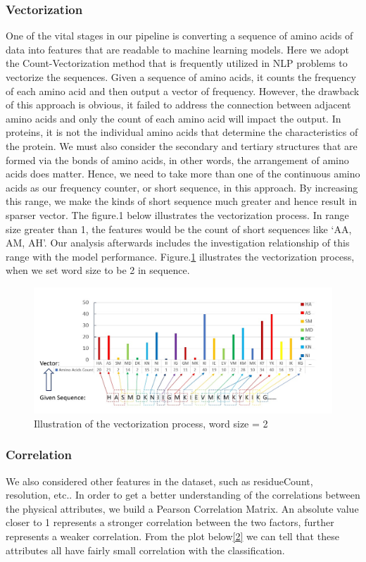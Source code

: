 \documentclass[sigconf]{acmart}
\begin{document}
\subsubsection{Vectorization}
One of the vital stages in our pipeline is converting a sequence of amino acids of data into features that are readable to machine learning models. Here we adopt the Count-Vectorization method that is frequently utilized in NLP problems to vectorize the sequences. Given a sequence of amino acids, it counts the frequency of each amino acid and then output a vector of frequency. However, the drawback of this approach is obvious, it failed to address the connection between adjacent amino acids and only the count of each amino acid will impact the output. In proteins, it is not the individual amino acids that determine the characteristics of the protein. We must also consider the secondary and tertiary structures that are formed via the bonds of amino acids, in other words, the arrangement of amino acids does matter. Hence, we need to take more than one of the continuous amino acids as our frequency counter, or short sequence, in this approach. By increasing this range, we make the kinds of short sequence much greater and hence result in sparser vector. The figure.1 below illustrates the vectorization process. In range size greater than 1, the features would be the count of short sequences like ‘AA, AM, AH’. Our analysis afterwards includes the investigation relationship of this range with the model performance. Figure.\ref{1} illustrates the vectorization process, when we set word size to be 2 in sequence.

\begin{figure}[h]
  \centering
  \includegraphics[width=\linewidth]{1.jpeg}
  \caption{Illustration of the vectorization process, word size = 2}
  \label{1}
\end{figure}

\subsubsection{Correlation}
We also considered other features in the dataset, such as residueCount, resolution, etc.. In order to get a better understanding of the correlations between the physical attributes, we build a Pearson Correlation Matrix. An absolute value closer to 1 represents a stronger correlation between the two factors, further represents a weaker correlation. From the plot below\ref{2} we can tell that these attributes all have fairly small correlation with the classification.
\end{document}
